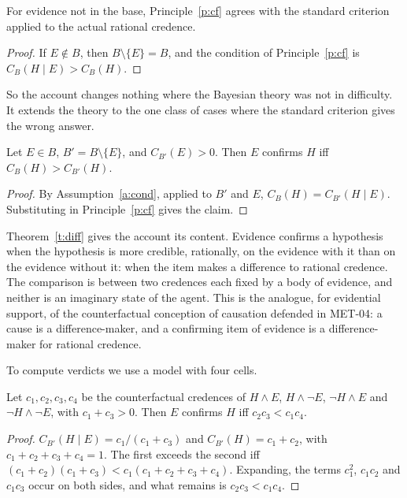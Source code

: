 \documentclass{situationist-preprint}
\begin{document}
\begin{proposition}[Conservativeness]\label{p:conservative}
For evidence not in the base, Principle~\ref{p:cf} agrees with the standard criterion applied to the actual rational credence.
\end{proposition}

\begin{proof}
If $E \notin B$, then $B \setminus \{E\} = B$, and the condition of Principle~\ref{p:cf} is $C_B(H \mid E) > C_B(H)$.
\end{proof}

So the account changes nothing where the Bayesian theory was not in difficulty. It extends the theory to the one class of cases where the standard criterion gives the wrong answer.

\begin{theorem}[Difference]\label{t:diff}
Let $E \in B$, $B' = B \setminus \{E\}$, and $C_{B'}(E) > 0$. Then $E$ confirms $H$ iff $C_B(H) > C_{B'}(H)$.
\end{theorem}

\begin{proof}
By Assumption~\ref{a:cond}, applied to $B'$ and $E$, $C_B(H) = C_{B'}(H \mid E)$. Substituting in Principle~\ref{p:cf} gives the claim.
\end{proof}

Theorem~\ref{t:diff} gives the account its content. Evidence confirms a hypothesis when the hypothesis is more credible, rationally, on the evidence with it than on the evidence without it: when the item makes a difference to rational credence. The comparison is between two credences each fixed by a body of evidence, and neither is an imaginary state of the agent. This is the analogue, for evidential support, of the counterfactual conception of causation defended in MET-04: a cause is a difference-maker, and a confirming item of evidence is a difference-maker for rational credence.

To compute verdicts we use a model with four cells.

\begin{theorem}\label{t:four}
Let $c_1, c_2, c_3, c_4$ be the counterfactual credences of $H \wedge E$, $H \wedge \neg E$, $\neg H \wedge E$ and $\neg H \wedge \neg E$, with $c_1 + c_3 > 0$. Then $E$ confirms $H$ iff $c_2 c_3 < c_1 c_4$.
\end{theorem}

\begin{proof}
$C_{B'}(H \mid E) = c_1/(c_1 + c_3)$ and $C_{B'}(H) = c_1 + c_2$, with $c_1 + c_2 + c_3 + c_4 = 1$. The first exceeds the second iff $(c_1 + c_2)(c_1 + c_3) < c_1(c_1 + c_2 + c_3 + c_4)$. Expanding, the terms $c_1^2$, $c_1 c_2$ and $c_1 c_3$ occur on both sides, and what remains is $c_2 c_3 < c_1 c_4$.
\end{proof}
\end{document}

